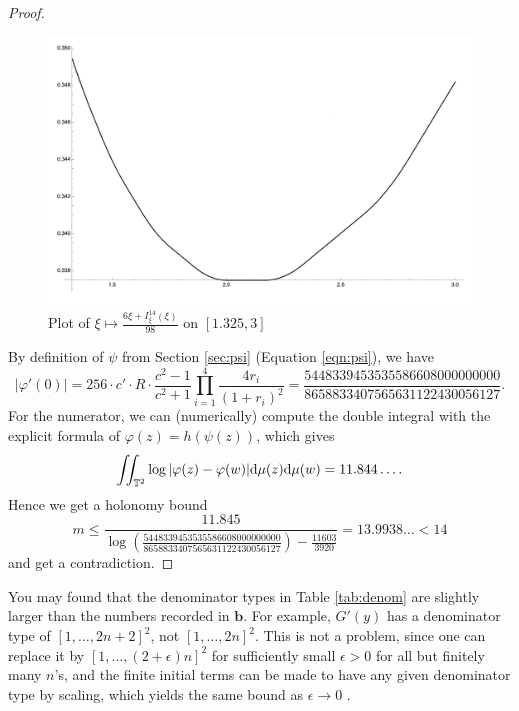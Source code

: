 \begin{proof}
\begin{figure}
    \centering
    \includegraphics[width=0.8\linewidth]{src/Igraph.png}
    \caption{Plot of $\xi \mapsto \frac{6 \xi + I_{\xi}^{14}(\xi)}{98}$ on $[1.325, 3]$ \cite[Figure 13.0.3]{calegari2024linear}}
    \label{fig:Igraph}
\end{figure}

By definition of $\psi$ from Section \ref{sec:psi} (Equation \eqref{eqn:psi}), we have
$$
    |\varphi'(0)| = 256 \cdot c' \cdot R \cdot \frac{c^2 - 1}{c^2 + 1} \prod_{i=1}^{4} \frac{4r_i}{(1 + r_i)^{2}} = \frac{5448339453535586608000000000}{8658833407565631122430056127}.
$$
For the numerator, we can (numerically) compute the double integral with the explicit formula of $\varphi(z) = h(\psi(z))$, which gives
$$
    \iint_{\mathbb{T}^2} \log |\varphi(z) - \varphi(w)| \mathrm{d} \mu(z) \mathrm{d} \mu(w) = 11.844\dots.
$$
Hence we get a holonomy bound
$$
    m \le \frac{11.845}{\log \left(\frac{5448339453535586608000000000}{8658833407565631122430056127}\right) - \frac{11603}{3920}} =13.9938 \dots < 14
$$
and get a contradiction.
\end{proof}

\begin{remark*}
You may found that the denominator types in Table \ref{tab:denom} are slightly larger than the numbers recorded in $\mathbf{b}$.
For example, $G'(y)$ has a denominator type of $[1, \dots, 2n + 2]^2$, not $[1, \dots, 2n]^2$.
This is not a problem, since one can replace it by $[1, \dots, (2 + \epsilon)n]^2$ for sufficiently small $\epsilon > 0$ for all but finitely many $n$'s, and the finite initial terms can be made to have any given denominator type by scaling, which yields the same bound as $\epsilon \to 0$ \cite[Remark 6.0.12]{calegari2024linear}.
\end{remark*}

